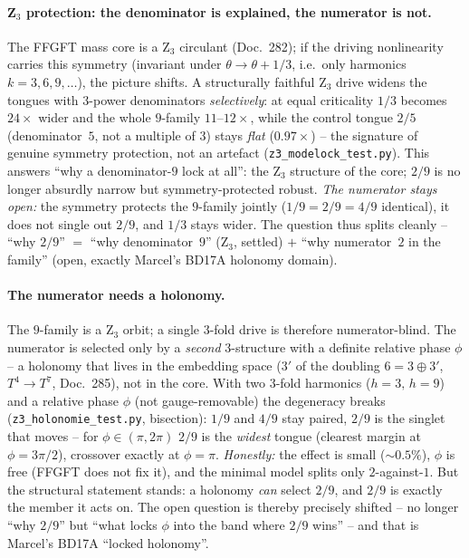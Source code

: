 \paragraph{Z$_3$ protection: the denominator is explained, the numerator is not.} The FFGFT mass core is
a Z$_3$ circulant (Doc.~282); if the driving nonlinearity carries this symmetry (invariant under
$\theta\!\to\!\theta+1/3$, i.e.\ only harmonics $k=3,6,9,\dots$), the picture shifts. A structurally
faithful Z$_3$ drive widens the tongues with $3$-power denominators \emph{selectively}: at equal
criticality $1/3$ becomes $24\times$ wider and the whole $9$-family $11$--$12\times$, while the control
tongue $2/5$ (denominator~$5$, not a multiple of $3$) stays \emph{flat} ($0.97\times$) -- the signature
of genuine symmetry protection, not an artefact (\texttt{z3\_modelock\_test.py}). This answers
\enquote{why a denominator-$9$ lock at all}: the Z$_3$ structure of the core; $2/9$ is no longer
absurdly narrow but symmetry-protected robust. \emph{The numerator stays open:} the symmetry protects
the $9$-family jointly ($1/9=2/9=4/9$ identical), it does not single out $2/9$, and $1/3$ stays wider.
The question thus splits cleanly -- \enquote{why $2/9$} $=$ \enquote{why denominator~$9$} (Z$_3$,
settled) $+$ \enquote{why numerator~$2$ in the family} (open, exactly Marcel's BD17A holonomy domain).

\paragraph{The numerator needs a holonomy.} The $9$-family is a Z$_3$ orbit; a single $3$-fold drive is
therefore numerator-blind. The numerator is selected only by a \emph{second} $3$-structure with a
definite relative phase $\phi$ -- a holonomy that lives in the embedding space ($3'$ of the doubling
$6=3\oplus3'$, $T^4\!\to\!T^7$, Doc.~285), not in the core. With two $3$-fold harmonics ($h{=}3,\,h{=}9$)
and a relative phase $\phi$ (not gauge-removable) the degeneracy breaks
(\texttt{z3\_holonomie\_test.py}, bisection): $1/9$ and $4/9$ stay paired, $2/9$ is the singlet that
moves -- for $\phi\in(\pi,2\pi)$ $2/9$ is the \emph{widest} tongue (clearest margin at $\phi=3\pi/2$),
crossover exactly at $\phi=\pi$. \emph{Honestly:} the effect is small ($\sim\!0.5\%$), $\phi$ is free
(FFGFT does not fix it), and the minimal model splits only $2$-against-$1$. But the structural statement
stands: a holonomy \emph{can} select $2/9$, and $2/9$ is exactly the member it acts on. The open
question is thereby precisely shifted -- no longer \enquote{why $2/9$} but \enquote{what locks $\phi$
into the band where $2/9$ wins} -- and that is Marcel's BD17A \enquote{locked holonomy}.

